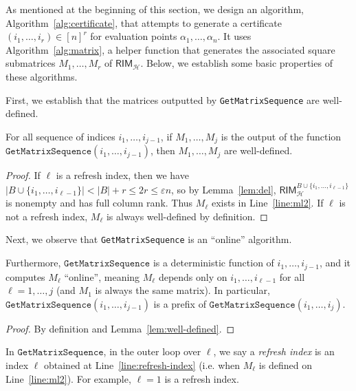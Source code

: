 \documentclass{article}[11pt]
\begin{document}
As mentioned at the beginning of this section, we design an algorithm,  Algorithm~\ref{alg:certificate}, that attempts to generate a certificate $(i_1,\dots,i_r)\in[n]^r$ for evaluation points $\alpha_1,\dots,\alpha_n$.
It uses Algorithm~\ref{alg:matrix}, a helper function that generates the associated square submatrices $M_1,\dots,M_r$ of $\mathsf{RIM}_\mathcal{H}$.
Below, we establish some basic properties of these algorithms.


First, we establish that the matrices outputted by \texttt{GetMatrixSequence} are well-defined.

\begin{lemma}
  For all sequence of indices $i_1,\dots,i_{j-1}$, if $M_1,\dots,M_j$ is the output of the function $\mathtt{GetMatrixSequence}(i_1,\dots,i_{j-1})$, then $M_1,\dots,M_j$ are well-defined.
  \label{lem:well-defined}
\end{lemma}
 \begin{proof}
    If $\ell$ is a refresh index, then we have $|B\cup\{i_1,\dots,i_{\ell-1}\}|< |B| + r \le 2r \le \varepsilon n$, so by Lemma~\ref{lem:del}, $\mathsf{RIM}_\mathcal{H}^{B\cup\{i_1,\dots,i_{\ell-1}\}}$ is nonempty and has full column rank. Thus $M_\ell$ exists in Line~\ref{line:ml2}.
    If $\ell$ is not a refresh index, $M_\ell$ is always well-defined by definition.
\end{proof}


Next, we observe that \texttt{GetMatrixSequence} is an ``online'' algorithm.
\begin{lemma}[Online]
  Furthermore, $\mathtt{GetMatrixSequence}$ is a deterministic function of $i_1,\dots,i_{j-1}$, and it computes $M_\ell$ ``online'', meaning $M_\ell$ depends only on $i_1,\dots,i_{\ell-1}$ for all $\ell=1,\dots,j$ (and $M_1$ is always the same matrix).
  In particular, $\mathtt{GetMatrixSequence}(i_1,\dots,i_{j-1})$ is a prefix of $\mathtt{GetMatrixSequence}(i_1,\dots,i_j)$.
  \label{lem:online}
\end{lemma}
\begin{proof}
    By definition and Lemma~\ref{lem:well-defined}.
\end{proof}

\begin{definition}
  In $\mathtt{GetMatrixSequence}$, in the outer loop over $\ell$, we say a \emph{refresh index} is an index $\ell$ obtained at Line~\ref{line:refresh-index} (i.e. when $M_\ell$ is defined on Line~\ref{line:ml2}).
  For example, $\ell=1$ is a refresh index.
\end{definition}
\end{document}
